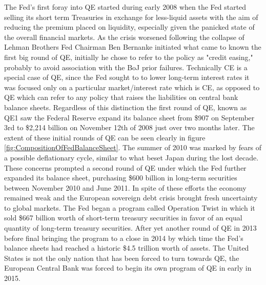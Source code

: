 \documentclass[12pt]{report}
\begin{document}
The Fed's first foray into QE started during early 2008 when the Fed started selling its short term Treasuries in exchange for less-liquid assets with the aim of reducing the premium placed on liquidity, especially given the panicked state of the overall financial markets.\autocite[467]{blinder2010quantitative}
As the crisis worsened following the collapse of Lehman Brothers Fed Chairman Ben Bernanke initiated what came to known the first big round of QE, initially he chose to refer to the policy as "credit easing," probably to avoid association with the BoJ prior failures.\autocite[465]{blinder2010quantitative}
Technically CE is a special case of QE, since the Fed sought to to lower long-term interest rates it was focused only on a particular market/interest rate which is CE, as opposed to QE which can refer to any policy that raises the liabilities on central bank balance sheets.\autocite[55]{fawley2013four}
Regardless of this distinction the first round of QE, known as QE1 saw the Federal Reserve expand its balance sheet from \$907 on September 3rd to \$2,214 billion on November 12th of 2008 just over two months later.\autocite[468]{blinder2010quantitative}
The extent of these initial rounds of QE can be seen clearly in figure \ref{fig:CompositionOfFedBalanceSheet}.
The summer of 2010 was marked by fears of a possible deflationary cycle, similar to what beset Japan during the lost decade.\autocite[1]{ricketts2014rise}
These concerns prompted a second round of QE under which the Fed further expanded its balance sheet, purchasing \$600 billion in long-term securities between November 2010 and June 2011.\autocite[1]{ricketts2014rise}
In spite of these efforts the economy remained weak and the European sovereign debt crisis brought fresh uncertainty to global markets.
The Fed began a program called Operation Twist in which it sold \$667 billion worth of short-term treasury securities in favor of an equal quantity of long-term treasury securities.\autocite[1]{ricketts2014rise}
After yet another round of QE in 2013\autocite[1]{ricketts2014rise} before final bringing the program to a close in 2014 by which time the Fed's balance sheets had reached a historic \$4.5 trillion worth of assets.\autocite{nytFed}
The United States is not the only nation that has been forced to turn towards QE, the European Central Bank was forced to begin its own program of QE in early in 2015.\autocite{economistQEGermany}

\iffalse
There is considerable concern that the policy will not be as effective in Europe as it has proven in the United States.\autocite{economistQEGermany}
Prior to Quantitative Easing, Europe had actually begun to enter deflation indicating that popular concern that the policy would lead to hyperinflation are largely irrational.\autocite{economistQEGermany}
\autocite{economistQEGermany}
\fi
\end{document}
